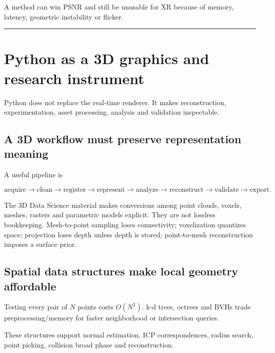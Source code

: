 A method can win PSNR and still be unusable for XR because of memory, latency, geometric instability or flicker.

\begin{center}\rule{0.5\linewidth}{0.5pt}\end{center}

\chapter{Python as a 3D graphics and research instrument}\label{04-visual-computing-ii-ch035-python-as-a-3d-graphics-and-research-instrument}

Python does not replace the real-time renderer. It makes reconstruction, experimentation, asset processing, analysis and validation inspectable.

\section{A 3D workflow must preserve representation meaning}\label{04-visual-computing-ii-ch035-a-3d-workflow-must-preserve-representation-meaning}

A useful pipeline is

\[
\text{acquire}\rightarrow\text{clean}\rightarrow\text{register}\rightarrow
\text{represent}\rightarrow\text{analyze}\rightarrow
\text{reconstruct}\rightarrow\text{validate}\rightarrow\text{export}.
\]

The 3D Data Science material makes conversions among point clouds, voxels, meshes, rasters and parametric models explicit. They are not lossless bookkeeping. Mesh-to-point sampling loses connectivity; voxelization quantizes space; projection loses depth unless depth is stored; point-to-mesh reconstruction imposes a surface prior.

\section{Spatial data structures make local geometry affordable}\label{04-visual-computing-ii-ch035-spatial-data-structures-make-local-geometry-affordable}

Testing every pair of \(N\) points costs \(O(N^2)\). k-d trees, octrees and BVHs trade preprocessing/memory for faster neighborhood or intersection queries.

These structures support normal estimation, ICP correspondences, radius search, point picking, collision broad phase and reconstruction.

